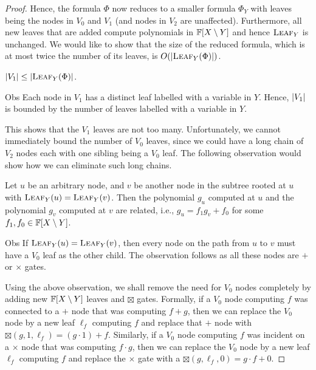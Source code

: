 \begin{proof}
  Hence, the formula $\Phi$ now reduces to a smaller formula $\Phi_Y$ with
  leaves  being the nodes in $V_0$ and $V_1$ (and nodes in $V_2$ are
  unaffected). 
  Furthermore, all new leaves that are added compute polynomials in $\mathbb{F}[X \setminus Y]$ and hence $\textsc{Leaf}_Y$ is unchanged. 
We would like to show that the size of the reduced
  formula, which is at most twice the number of its leaves, is
  $O(\left|\textsc{Leaf}_Y(\Phi)\right|)$.

  \begin{observation}\label{obs:v1-bound}$\left|V_1\right| \leq \left|\textsc{Leaf}_Y(\Phi)\right|$.    
  \end{observation}
  \begin{myproof}{Obs}
    Each node in $V_1$ has a distinct leaf labelled with a variable in $Y$.
Hence, $\left|V_1\right|$ is bounded by the number of leaves labelled with a variable in $Y$.
  \end{myproof}
  
  This shows that the $V_1$ leaves are not too many.
Unfortunately, we cannot immediately bound the number of $V_0$ leaves, since we could have a long chain of $V_2$ nodes each with one sibling being a $V_0$ leaf.
The following observation would show how we can eliminate such long chains.

  \begin{observation}\label{obs:same-leaf-collapse}
    Let $u$ be an arbitrary node, and $v$ be another node in the subtree rooted at $u$ with $\textsc{Leaf}_Y(u) = \textsc{Leaf}_Y(v)$.
Then the polynomial $g_u$ computed at $u$ and the polynomial $g_v$ computed at $v$ are related, i.e., $g_u = f_1 g_v + f_0$ for some $f_1,f_0 \in \mathbb{F}[X\setminus Y]$.
  \end{observation}
  \begin{myproof}{Obs}
    If $\textsc{Leaf}_Y(u) =\textsc{Leaf}_Y(v)$, then every node on
    the path from $u$ to $v$ must have a $V_0$ leaf as the other child. 
The
    observation follows as all these nodes are $+$ or $\times$ gates.
  \end{myproof}

  Using the above observation, we shall remove the need for $V_0$
  nodes completely by adding new $\mathbb{F}[X\setminus Y]$ leaves and $\boxtimes$ gates. 
  Formally, if a $V_0$ node computing $f$ was connected to a $+$ node that was computing $f + g$, then we can replace the $V_0$ node by a new leaf $\ell_f$ computing $f$ and replace that $+$ node with $\boxtimes(g,1,\ell_f) = (g \cdot 1) + f$. Similarly, if a $V_0$ node computing $f$ was incident on a $\times$ node that was computing $f \cdot g$, then we can replace the $V_0$ node by a new leaf $\ell_f$ computing $f$ and replace the $\times$ gate with a $\boxtimes(g,\ell_f,0) = g \cdot f + 0$. 


\end{proof}
